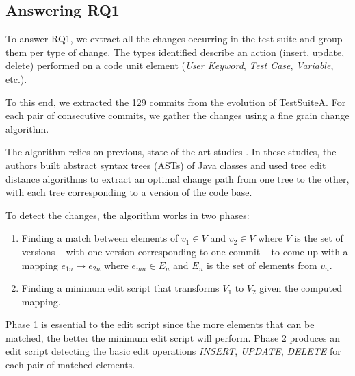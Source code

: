 \subsection{Answering RQ1}
\label{sec:evolution-protocol-rq1}

To answer RQ1, we extract all the changes occurring in the test suite and group them per type of change. The types identified describe an action (insert, update, delete) performed on a code unit element (\emph{User Keyword}, \emph{Test Case}, \emph{Variable}, etc.). 

To this end, we extracted the 129 commits from the evolution of TestSuiteA. For each pair of consecutive commits, we gather the changes using a fine grain change algorithm.

The algorithm relies on previous, state-of-the-art studies \cite{Chawathe1996, Falleri2014, Fluri2007, Pinto2012}. In these studies, the authors built abstract syntax trees (ASTs) of Java classes and used tree edit distance algorithms to extract an optimal change path from one tree to the other, with each tree corresponding to a version of the code base.

To detect the changes, the algorithm works in two phases:

\begin{enumerate}
    \item Finding a match between elements of $v_1 \in V$ and $v_2 \in V$ where $V$ is the set of versions -- with one version corresponding to one commit -- to come up with a mapping $e_{1n} \rightarrow e_{2n}$ where $e_{mn} \in E_n$ and $E_n$ is the set of elements from $v_n$.
  
    \item Finding a minimum edit script that transforms $V_1$ to $V_2$ given the computed mapping.
\end{enumerate}

Phase 1 is essential to the edit script since the more elements that can be matched, the better the minimum edit script will perform. Phase 2 produces  an edit script detecting the basic edit operations \emph{INSERT}, \emph{UPDATE}, \emph{DELETE} for each pair of matched elements.

